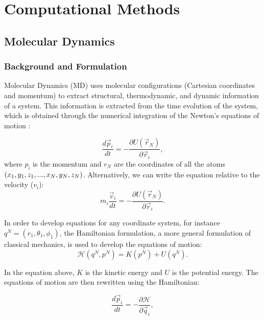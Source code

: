 
\chapter{Computational Methods} %

\label{Chapter3} %

\section{Molecular Dynamics}

\subsection{Background and Formulation}
Molecular Dynamics (MD) uses molecular configurations (Cartesian coordinates and momentum) to extract structural, thermodynamic, and dynamic information of a system. This information is extracted from the time evolution of the system, which is obtained  through the numerical integration of the Newton's equations of motion \cite{tuckerman}:

\begin{equation}
\frac{d \vec{p}_{i}}{dt} = - \frac{\partial U (\vec{r}_{N})}{\partial \vec{r}_{i}},
\end{equation}
where $p_{i}$ is the momentum and $r_{N}$ are the coordinates of all the atoms $(x_{1},y_{1},z_{1},..., x_{N},\\ y_{N},z_{N})$. Alternatively, we can write the equation relative to the velocity ($v_{i}$):
\begin{equation}
m_{i} \frac{\vec{v}_{i}}{dt} = - \frac{\partial U (\vec{r}_{N})}{\partial \vec{r}_{i}}.
\end{equation}

In order to develop equations for any coordinate system, for instance $q^{N}=(r_{1},\theta _{1},\phi _{1})$, the Hamiltonian formulation, a more general formulation of classical mechanics,  is used to develop the equations of motion:
\begin{equation}
\mathcal{H} (q^{N},p^{N}) = K(p^{N}) + U(q^{N}) .
\end{equation}

In the equation above, $K$ is the kinetic energy and $U$ is the potential energy. The equations of motion are then rewritten using the Hamiltonian:

\begin{equation}
\frac{d \vec{p}_{i}}{dt} = - \frac{\partial \mathcal{H}}{\partial \vec{q}_{i}},
\end{equation}

